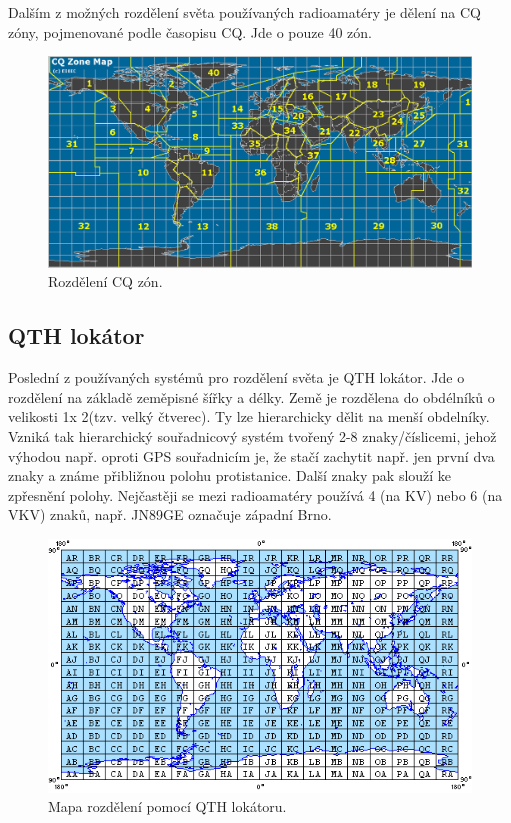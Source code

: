 Dalším z možných rozdělení světa používaných radioamatéry je dělení na CQ zóny, pojmenované podle časopisu CQ.
Jde o pouze 40 zón.

\begin{figure}[h]
\centering
\includegraphics[trim=0cm 0cm 0cm 0cm, scale=0.4]{fig/cq-zone}
\caption{Rozdělení CQ zón.}
\label{fig:FigureExample}
\end{figure}

\subsection{QTH lokátor}

Poslední z používaných systémů pro rozdělení světa je QTH lokátor. Jde o rozdělení na základě zeměpisné šířky a délky.
Země je rozdělena do obdélníků o velikosti 1\degree x 2\degree (tzv. velký
čtverec). Ty lze hierarchicky dělit na menší obdelníky. Vzniká tak hierarchický
souřadnicový systém tvořený 2-8 znaky/číslicemi, jehož výhodou např. oproti GPS
souřadnicím je, že stačí zachytit např. jen první dva znaky a známe přibližnou
polohu protistanice. Další znaky pak slouží ke zpřesnění polohy. Nejčastěji se
mezi radioamatéry používá 4 (na KV) nebo 6 (na VKV) znaků, např. JN89GE označuje
západní Brno.  

\begin{figure}[h]
\centering
\includegraphics[trim=0cm 0cm 0cm 0cm, scale=0.7]{fig/QTH_locator}
\caption{Mapa rozdělení pomocí QTH lokátoru.}
\label{fig:FigureExample}
\end{figure}

